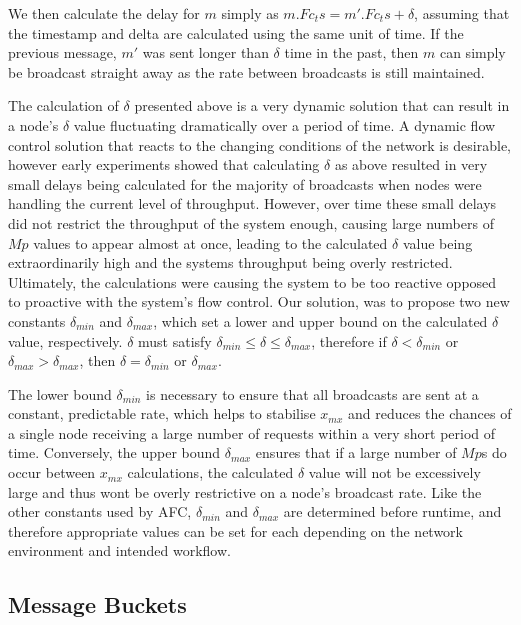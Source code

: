     We then calculate the delay for $m$ simply as $m.Fc_ts = m'.Fc_ts + \delta$, assuming that the timestamp and delta are calculated using the same unit of time.  If the previous message, $m'$ was sent longer than $\delta$ time in the past, then $m$ can simply be broadcast straight away as the rate between broadcasts is still maintained.  
    
    The calculation of $\delta$ presented above is a very dynamic solution that can result in a node's $\delta$ value fluctuating dramatically over a period of time.  A dynamic flow control solution that reacts to the changing conditions of the network is desirable, however early experiments showed that calculating $\delta$ as above resulted in very small delays being calculated for the majority of broadcasts when nodes were handling the current level of throughput.  However, over time these small delays did not restrict the throughput of the system enough, causing large numbers of $Mp$ values to appear almost at once, leading to the calculated $\delta$ value being extraordinarily high and the systems throughput being overly restricted.  Ultimately, the calculations were causing the system to be too reactive opposed to proactive with the system's flow control.  Our solution, was to propose two new constants $\delta_{min}$ and $\delta_{max}$, which set a lower and upper bound on the calculated $\delta$ value, respectively.  $\delta$ must satisfy $\delta_{min} \leq \delta \leq \delta_{max}$, therefore if $\delta < \delta_{min}$ or $\delta_{max} > \delta_{max}$, then $\delta = \delta_{min}$ or $\delta_{max}$.
    
    The lower bound $\delta_{min}$ is necessary to ensure that all broadcasts are sent at a constant, predictable rate, which helps to stabilise $x_{mx}$ and reduces the chances of a single node receiving a large number of requests within a very short period of time.  Conversely, the upper bound $\delta_{max}$ ensures that if a large number of $Mp$s do occur between $x_{mx}$ calculations, the calculated $\delta$ value will not be excessively large and thus wont be overly restrictive on a node's broadcast rate.  Like the other constants used by AFC, $\delta_{min}$ and $\delta_{max}$ are determined before runtime, and therefore appropriate values can be set for each depending on the network environment and intended workflow. 
    
    \subsection*{Message Buckets}
